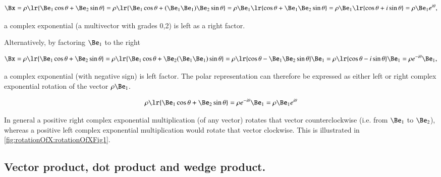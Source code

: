 \begin{dmath}\label{eqn:SimpleProducts2:940}
\Bx
=
\rho \lr{ \Be_1 \cos\theta + \Be_2 \sin\theta }
=
\rho \lr{ \Be_1 \cos\theta + (\Be_1 \Be_1) \Be_2 \sin\theta }
=
\rho \Be_1 \lr{ \cos\theta + \Be_1 \Be_2 \sin\theta }
=
\rho \Be_1 \lr{ \cos\theta + i \sin\theta }
=
\rho \Be_1 e^{i\theta},
\end{dmath}

a complex exponential (a multivector with grades 0,2) is left as a right factor.

Alternatively, by factoring \( \Be_1 \) to the right

\begin{dmath}\label{eqn:SimpleProducts2:960}
\Bx
=
\rho \lr{ \Be_1 \cos\theta + \Be_2 \sin\theta }
=
\rho \lr{ \Be_1 \cos\theta + \Be_2 (\Be_1 \Be_1) \sin\theta }
=
\rho \lr{ \cos\theta - \Be_1 \Be_2 \sin\theta } \Be_1
=
\rho \lr{ \cos\theta - i \sin\theta } \Be_1
=
\rho e^{-i\theta} \Be_1,
\end{dmath}

a complex exponential (with negative sign) is left factor.
The polar representation can therefore be expressed as either left or right complex exponential rotation of the vector \( \rho \Be_1 \).

\begin{equation}\label{eqn:SimpleProducts2:1120}
\rho \lr{ \Be_1 \cos\theta + \Be_2 \sin\theta }
= \rho e^{-i\theta} \Be_1 = \rho \Be_1 e^{i\theta}
\end{equation}

In general a positive right complex exponential multiplication (of any vector) rotates that vector counterclockwise (i.e. from \( \Be_1 \) to \( \Be_2 \)), whereas a positive left complex exponential multiplication would rotate that vector clockwise.  This is
illustrated in \cref{fig:rotationOfX:rotationOfXFig1}.


\subsection{Vector product, dot product and wedge product.}

